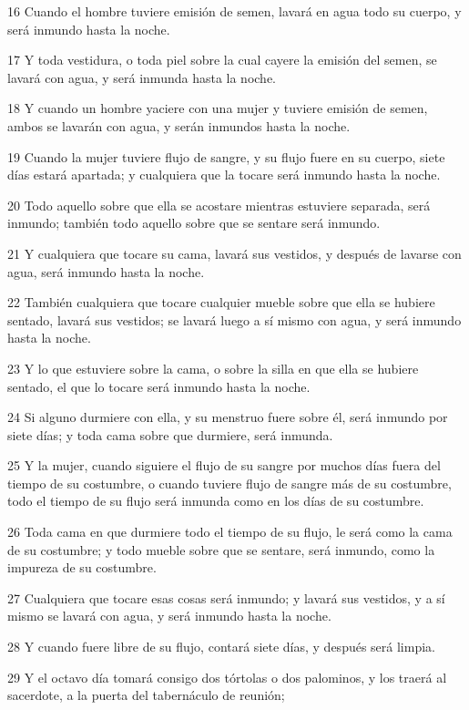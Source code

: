 \par 16 Cuando el hombre tuviere emisión de semen, lavará en agua todo su cuerpo, y será inmundo hasta la noche.
\par 17 Y toda vestidura, o toda piel sobre la cual cayere la emisión del semen, se lavará con agua, y será inmunda hasta la noche.
\par 18 Y cuando un hombre yaciere con una mujer y tuviere emisión de semen, ambos se lavarán con agua, y serán inmundos hasta la noche.
\par 19 Cuando la mujer tuviere flujo de sangre, y su flujo fuere en su cuerpo, siete días estará apartada; y cualquiera que la tocare será inmundo hasta la noche.
\par 20 Todo aquello sobre que ella se acostare mientras estuviere separada, será inmundo; también todo aquello sobre que se sentare será inmundo.
\par 21 Y cualquiera que tocare su cama, lavará sus vestidos, y después de lavarse con agua, será inmundo hasta la noche.
\par 22 También cualquiera que tocare cualquier mueble sobre que ella se hubiere sentado, lavará sus vestidos; se lavará luego a sí mismo con agua, y será inmundo hasta la noche.
\par 23 Y lo que estuviere sobre la cama, o sobre la silla en que ella se hubiere sentado, el que lo tocare será inmundo hasta la noche.
\par 24 Si alguno durmiere con ella, y su menstruo fuere sobre él, será inmundo por siete días; y toda cama sobre que durmiere, será inmunda.
\par 25 Y la mujer, cuando siguiere el flujo de su sangre por muchos días fuera del tiempo de su costumbre, o cuando tuviere flujo de sangre más de su costumbre, todo el tiempo de su flujo será inmunda como en los días de su costumbre.
\par 26 Toda cama en que durmiere todo el tiempo de su flujo, le será como la cama de su costumbre; y todo mueble sobre que se sentare, será inmundo, como la impureza de su costumbre.
\par 27 Cualquiera que tocare esas cosas será inmundo; y lavará sus vestidos, y a sí mismo se lavará con agua, y será inmundo hasta la noche.
\par 28 Y cuando fuere libre de su flujo, contará siete días, y después será limpia.
\par 29 Y el octavo día tomará consigo dos tórtolas o dos palominos, y los traerá al sacerdote, a la puerta del tabernáculo de reunión;
